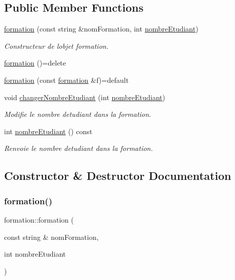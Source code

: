\subsection*{Public Member Functions}
\begin{DoxyCompactItemize}
\item 
\hyperlink{classformation_ad20a90943dd2ef544b970d1bd440000f}{formation} (const string \&nom\+Formation, int \hyperlink{classformation_a917c18b3f7439abad5114b5a89b1a01a}{nombre\+Etudiant})
\begin{DoxyCompactList}\small\item\em Constructeur de l\textquotesingle{}objet formation. \end{DoxyCompactList}\item 
\hyperlink{classformation_ada1d251270861261f2bc09f6dc5f99fd}{formation} ()=delete
\item 
\hyperlink{classformation_ac1dee8c42dcaad6c1f35b74b4c71b26f}{formation} (const \hyperlink{classformation}{formation} \&f)=default
\item 
void \hyperlink{classformation_abe934ed262e616341b9d168bd2faf8bb}{changer\+Nombre\+Etudiant} (int \hyperlink{classformation_a917c18b3f7439abad5114b5a89b1a01a}{nombre\+Etudiant})
\begin{DoxyCompactList}\small\item\em Modifie le nombre d\textquotesingle{}etudiant dans la formation. \end{DoxyCompactList}\item 
int \hyperlink{classformation_a917c18b3f7439abad5114b5a89b1a01a}{nombre\+Etudiant} () const
\begin{DoxyCompactList}\small\item\em Renvoie le nombre d\textquotesingle{}etudiant dans la formation. \end{DoxyCompactList}\end{DoxyCompactItemize}


\subsection{Constructor \& Destructor Documentation}
\hypertarget{classformation_ad20a90943dd2ef544b970d1bd440000f}{}\label{classformation_ad20a90943dd2ef544b970d1bd440000f} 
\subsubsection{\texorpdfstring{formation()}{formation()}\hspace{0.1cm}{\footnotesize\ttfamily [1/3]}}
{\footnotesize\ttfamily formation\+::formation (\begin{DoxyParamCaption}\item[{const string \&}]{nom\+Formation,  }\item[{int}]{nombre\+Etudiant }\end{DoxyParamCaption})}



